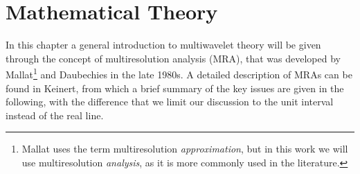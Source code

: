 \chapter{Mathematical Theory}
In this chapter a general introduction to multiwavelet theory will be given through 
the concept of multiresolution analysis (MRA), that was developed by 
Mallat\cite{Mallat:1989}\footnote{Mallat uses the term multiresolution 
\emph{approximation}, but in this work we will use multiresolution \emph{analysis}, as 
it is more commonly used in the literature.} and Daubechies\cite{Daubechies:1988} in
the late 1980s. A detailed description of MRAs can be found in 
Keinert\cite{Keinert:2004}, from which a brief summary of the key issues are given in 
the following, with the difference that we limit our discussion to the unit interval 
instead of the real line.

